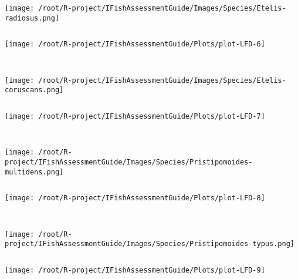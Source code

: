 \begin{knitrout}
\begin{kframe}
\begin{verbatim}
\end{verbatim}
\end{kframe}
\texttt{[image: /root/R-project/IFishAssessmentGuide/Images/Species/Etelis-radiosus.png]}
\begin{kframe}\begin{verbatim}
\end{verbatim}
\end{kframe}
\texttt{[image: /root/R-project/IFishAssessmentGuide/Plots/plot-LFD-6]} 
\begin{kframe}\begin{verbatim}
 
\end{verbatim}
\end{kframe}
\texttt{[image: /root/R-project/IFishAssessmentGuide/Images/Species/Etelis-coruscans.png]}
\begin{kframe}\begin{verbatim}
\end{verbatim}
\end{kframe}
\texttt{[image: /root/R-project/IFishAssessmentGuide/Plots/plot-LFD-7]} 
\begin{kframe}\begin{verbatim}
 
\end{verbatim}
\end{kframe}
\texttt{[image: /root/R-project/IFishAssessmentGuide/Images/Species/Pristipomoides-multidens.png]}
\begin{kframe}\begin{verbatim}
\end{verbatim}
\end{kframe}
\texttt{[image: /root/R-project/IFishAssessmentGuide/Plots/plot-LFD-8]} 
\begin{kframe}\begin{verbatim}
 
\end{verbatim}
\end{kframe}
\texttt{[image: /root/R-project/IFishAssessmentGuide/Images/Species/Pristipomoides-typus.png]}
\begin{kframe}\begin{verbatim}
\end{verbatim}
\end{kframe}
\texttt{[image: /root/R-project/IFishAssessmentGuide/Plots/plot-LFD-9]} 
\begin{kframe}\begin{verbatim}
 

\end{verbatim}
\end{kframe}
\end{knitrout}
